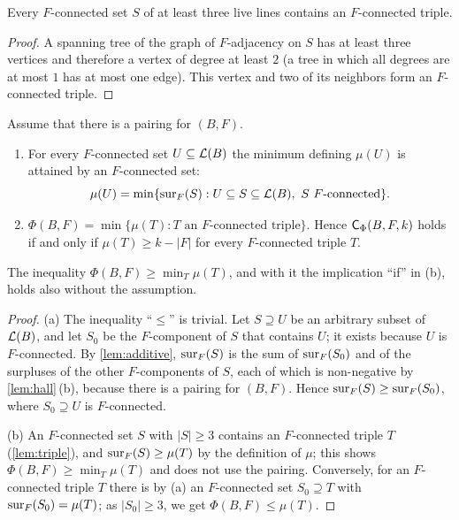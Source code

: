 \begin{lemma}\label{lem:triple}
Every $F$-connected set $S$ of at least three live lines contains an $F$-connected triple.
\end{lemma}

\begin{proof}
A spanning tree of the graph of $F$-adjacency on $S$ has at least three vertices and therefore a vertex
of degree at least $2$ (a tree in which all degrees are at most $1$ has at most one edge). This vertex
and two of its neighbors form an $F$-connected triple.
\end{proof}

\begin{proposition}\label{prop:triples}
Assume that there is a pairing for $(B,F)$.
\begin{enumerate}[label=\textup{(\alph*)}]
\item For every $F$-connected set $U\subseteq\mathcal{L}(B)$ the minimum defining $\mu(U)$ is attained by an
      $F$-connected set:
      \[ \mu(U)=\min\{\operatorname{sur}_F(S) : U\subseteq S\subseteq\mathcal{L}(B),\ S\ F\text{-connected}\}. \]
\item $\Phi(B,F)=\min\{\mu(T) : T \text{ an $F$-connected triple}\}$. Hence $\mathsf{C}_\Phi(B,F,k)$ holds if and only
      if $\mu(T)\ge k-|F|$ for every $F$-connected triple $T$.
\end{enumerate}
The inequality $\Phi(B,F)\ge\min_T\mu(T)$, and with it the implication ``if'' in \textup{(b)}, holds also
without the assumption.
\end{proposition}

\begin{proof}
(a) The inequality ``$\le$'' is trivial. Let $S\supseteq U$ be an arbitrary subset of $\mathcal{L}(B)$, and let
$S_0$ be the $F$-component of $S$ that contains $U$; it exists because $U$ is $F$-connected. By
\cref{lem:additive}, $\operatorname{sur}_F(S)$ is the sum of $\operatorname{sur}_F(S_0)$ and of the surpluses of the other
$F$-components of $S$, each of which is non-negative by \cref{lem:hall}\,(b), because there is a pairing
for $(B,F)$. Hence $\operatorname{sur}_F(S)\ge\operatorname{sur}_F(S_0)$, where $S_0\supseteq U$ is $F$-connected.

(b) An $F$-connected set $S$ with $|S|\ge 3$ contains an $F$-connected triple $T$ (\cref{lem:triple}), and
$\operatorname{sur}_F(S)\ge\mu(T)$ by the definition of $\mu$; this shows $\Phi(B,F)\ge\min_T\mu(T)$ and does not use the
pairing. Conversely, for an $F$-connected triple $T$ there is by (a) an $F$-connected set $S_0\supseteq T$
with $\operatorname{sur}_F(S_0)=\mu(T)$; as $|S_0|\ge 3$, we get $\Phi(B,F)\le\mu(T)$.
\end{proof}

